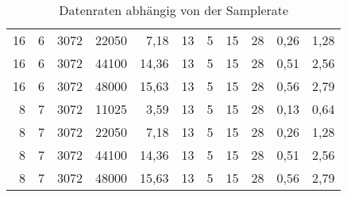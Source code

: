 \begin{table}[h]
\begin{tabular}{rrrrrrrrrrr}
16                     & 6                      & 3072                   & 22050                           & 7,18                                 & 13                     & 5                      & 15                     & 28                     & 0,26                          & 1,28                                      \\
16                     & 6                      & 3072                   & 44100                           & 14,36                                & 13                     & 5                      & 15                     & 28                     & 0,51                          & 2,56                                      \\
16                     & 6                      & 3072                   & 48000                           & 15,63                                & 13                     & 5                      & 15                     & 28                     & 0,56                          & 2,79                                      \\
8                      & 7                      & 3072                   & 11025                           & 3,59                                 & 13                     & 5                      & 15                     & 28                     & 0,13                          & 0,64                                      \\
8                      & 7                      & 3072                   & 22050                           & 7,18                                 & 13                     & 5                      & 15                     & 28                     & 0,26                          & 1,28                                      \\
8                      & 7                      & 3072                   & 44100                           & 14,36                                & 13                     & 5                      & 15                     & 28                     & 0,51                          & 2,56                                      \\
8                      & 7                      & 3072                   & 48000                           & 15,63                                & 13                     & 5                      & 15                     & 28                     & 0,56                          & 2,79                                      \\ \hline
\end{tabular}
\caption{Datenraten abhängig von der Samplerate}
\label{tab:datenraten}
\end{table}

